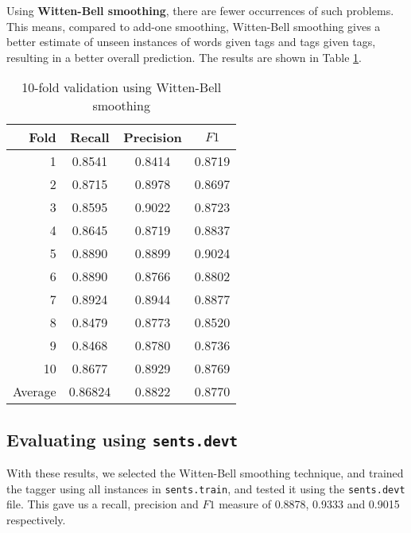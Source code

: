 \documentclass[12pt]{homework}
\begin{document}
Using \textbf{Witten-Bell smoothing}, there are fewer occurrences of such 
problems. This means, compared to add-one smoothing, Witten-Bell smoothing gives 
a better estimate of unseen instances of words given tags and tags given tags, 
resulting in a better overall prediction. The results are shown in Table 
\ref{wbresult}.
\begin{table}
	\begin{center}
	\begin{tabular}{r | c c c}
	\hline
	Fold	&	Recall	&	Precision	&	$F1$ \\
	\hline
	1		&	0.8541	&	0.8414		&	0.8719\\
	2		&	0.8715	&	0.8978		&	0.8697\\
	3		&	0.8595	&	0.9022		&	0.8723\\
	4		&	0.8645	&	0.8719		&	0.8837\\
	5		&	0.8890	&	0.8899		&	0.9024\\
	6		&	0.8890	&	0.8766		&	0.8802\\
	7		&	0.8924	&	0.8944		&	0.8877\\
	8		&	0.8479	&	0.8773		&	0.8520\\
	9		&	0.8468	&	0.8780		&	0.8736\\
	10		&	0.8677	&	0.8929		&	0.8769\\
	\hline
	Average	&	0.86824	&	0.8822		&	0.8770	\\
	\hline
	\end{tabular}

	\end{center}
	\caption{10-fold validation using Witten-Bell smoothing}
	\label{wbresult}
\end{table}
\subsection{Evaluating using \texttt{sents.devt}}

With these results, we selected the Witten-Bell smoothing technique, and trained 
the tagger using all instances in \texttt{sents.train}, and tested it using the 
\texttt{sents.devt} file. This gave us a recall, precision and $F1$ measure of 
0.8878, 0.9333 and 	0.9015 respectively.
\end{document}
